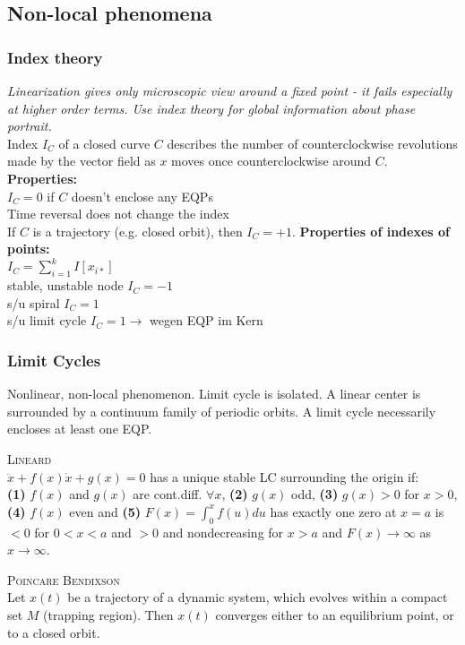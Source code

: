 \subsection{Non-local phenomena}
\subsubsection{Index theory}
\emph{Linearization gives only microscopic view around a fixed point - it fails especially at higher order terms. Use index theory for global information about phase portrait.}\\
Index $I_C$ of a closed curve $C$ describes the number of counterclockwise revolutions made by the vector field as $x$ moves once counterclockwise around $C$.\\
\textbf{Properties:}\\
$I_C=0$ if $C$ doesn't enclose any EQPs\\
Time reversal does not change the index\\
If $C$ is a trajectory (e.g. closed orbit), then $I_C=+1$.\vspace{0.1cm}
\textbf{Properties of indexes of points:}\\
$I_C=\sum_{i=1}^k I[x_{i*}]$\\
stable, unstable node $I_C = -1$\\
s/u spiral $I_C = 1$\\
s/u limit cycle $I_C = 1 \rightarrow$ wegen EQP im Kern
\subsubsection{Limit Cycles}
Nonlinear, non-local phenomenon. Limit cycle is isolated. A linear center is surrounded by a continuum family of periodic orbits. A limit cycle necessarily encloses at least one EQP.

\textsc{Lineard}\\
$\ddot{x}+f(x) \dot{x} + g(x)=0$ has a unique stable LC surrounding the origin if:\\
\textbf{(1)} $f(x)$ and $g(x)$ are cont.diff. $\forall x$, \textbf{(2)} $g(x)$ odd, \textbf{(3)} $g(x)>0$ for $x>0$, \textbf{(4)} $f(x)$ even and \textbf{(5)} $F(x)=\int_0^x f(u)du$ has exactly one zero at $x=a$ is $<0$ for $0<x<a$ and $>0$ and nondecreasing for $x>a$ and $F(x)\rightarrow\infty$ as $x\rightarrow \infty$.\vspace{0.2cm}

\textsc{Poincare Bendixson}\\
Let $x(t)$ be a trajectory of a dynamic system, which evolves within a compact set $M$ (trapping region). Then $x(t)$ converges either to an equilibrium point, or to a closed orbit.\vspace{0.2cm}

